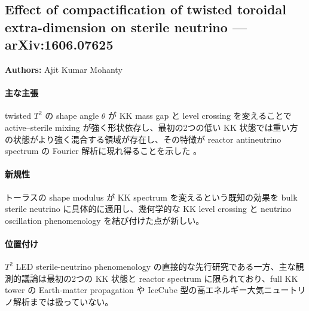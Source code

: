 \subsection{Effect of compactification of twisted toroidal extra-dimension on sterile neutrino --- arXiv:1606.07625}

\textbf{Authors:} Ajit Kumar Mohanty

\paragraph{主な主張}
twisted $T^2$ の shape angle $\theta$ が KK mass gap と level crossing を変えることで active--sterile mixing が強く形状依存し、最初の2つの低い KK 状態では重い方の状態がより強く混合する領域が存在し、その特徴が reactor antineutrino spectrum の Fourier 解析に現れ得ることを示した \cite{Mohanty:2016twisted}。

\paragraph{新規性}
トーラスの shape modulus が KK spectrum を変えるという既知の効果を bulk sterile neutrino に具体的に適用し、幾何学的な KK level crossing と neutrino oscillation phenomenology を結び付けた点が新しい。

\paragraph{位置付け}
$T^2$ LED sterile-neutrino phenomenology の直接的な先行研究である一方、主な観測的議論は最初の2つの KK 状態と reactor spectrum に限られており、full KK tower の Earth-matter propagation や IceCube 型の高エネルギー大気ニュートリノ解析までは扱っていない。

